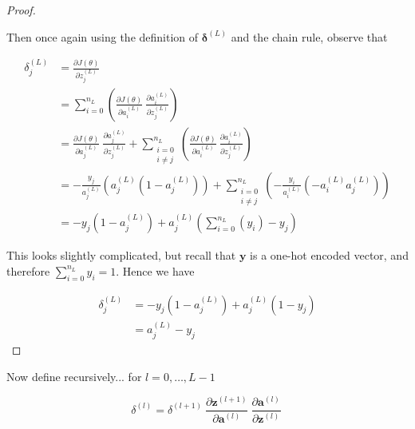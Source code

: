 \documentclass{article}[11pt]
\begin{document}
\begin{proof}
\begin{itemize}
            \end{itemize}
            
            Then once again using the definition of $\boldsymbol{\delta}^{(L)}$ and the chain rule, observe that
            
            $$ \begin{aligned}
            \delta^{(L)}_j &= \frac{\partial J(\theta)}{\partial z^{(L)}_j} \\
            &= \sum_{i = 0}^{n_L} \left( \frac{\partial J(\theta)}{\partial a^{(L)}_i} \ \frac{\partial a^{(L)}_i}{\partial z^{(L)}_j} \right) \\
            &= \frac{\partial J(\theta)}{\partial a^{(L)}_j} \ \frac{\partial a^{(L)}_j}{\partial z^{(L)}_j} + \sum_{\substack{i = 0 \\ i \neq j}}^{n_L} \left( \frac{\partial J(\theta)}{\partial a^{(L)}_i} \ \frac{\partial a^{(L)}_i}{\partial z^{(L)}_j} \right) \\
            &= - \frac{y_j}{a^{(L)}_j} \left( a^{(L)}_j (1 - a^{(L)}_j) \right) + \sum_{\substack{i = 0 \\ i \neq j}}^{n_L} \left( - \frac{y_i}{a^{(L)}_i} \left(- a^{(L)}_i a^{(L)}_j \right) \right) \\
            &= - y_j (1 - a^{(L)}_j) + a^{(L)}_j \left( \sum_{i = 0}^{n_L} \left( y_i \right) - y_j \right)
            \end{aligned} $$
            
            This looks slightly complicated, but recall that $\mathbf{y}$ is a one-hot encoded vector, and therefore $\sum_{i = 0}^{n_L} y_i = 1$. Hence we have
            
            $$ \begin{aligned}
            \delta^{(L)}_j &= - y_j (1 - a^{(L)}_j) + a^{(L)}_j (1 - y_j) \\
            &= a^{(L)}_j - y_j
            \end{aligned} $$
            
        \end{proof}
        
        
        Now define recursively... for $l = 0, \ldots, L-1$
        
        $$
        \delta^{(l)} =
        \delta^{(l+1)} \
        \frac{\partial \mathbf{z}^{(l+1)}}{\partial \mathbf{a}^{(l)}} \
        \frac{\partial \mathbf{a}^{(l)}}{\partial \mathbf{z}^{(l)}} \
        $$
        
\end{document}
